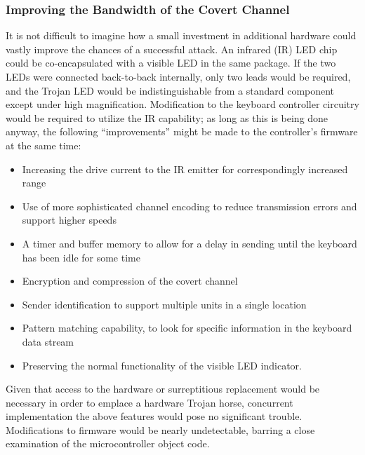\documentclass[twocolumn]{article}
\begin{document}
{\subsubsection{Improving the Bandwidth of the Covert Channel}

It is not difficult to imagine how a small investment in additional hardware could vastly improve the chances of a successful attack.  An infrared (IR) LED chip could be co-encapsulated with a visible LED in the same package.  If the two LEDs were connected back-to-back internally, only two leads would be required, and the Trojan LED would be indistinguishable from a standard component except under high magnification.  Modification to the keyboard controller circuitry would be required to utilize the IR capability; as long as this is being done anyway, the following ``improvements'' might be made to the controller's firmware at the same time:

\begin{itemize}

\item Increasing the drive current to the IR emitter for correspondingly increased range

\item Use of more sophisticated channel encoding to reduce transmission errors and support higher speeds

\item A timer and buffer memory to allow for a delay in sending until the keyboard has been idle for some time

\item Encryption and compression of the covert channel

\item Sender identification to support multiple units in a single location

\item Pattern matching capability, to look for specific information in the keyboard data stream

\item Preserving the normal functionality of the visible LED indicator.

\end{itemize}

Given that access to the hardware or surreptitious replacement would be necessary in order to emplace a hardware Trojan horse, concurrent implementation the above features would pose no significant trouble.  Modifications to firmware would be nearly undetectable, barring a close examination of the microcontroller object code.

}
\end{document}
